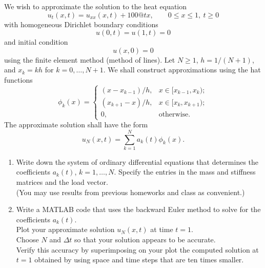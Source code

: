 We wish to approximate the solution to the heat equation 
\[
u_t(x,t) =  u_{xx}(x,t) + 100@t x, \qquad 0\le x \le 1,\ t\ge 0
\]
with homogeneous Dirichlet boundary conditions
\[
u(0,t) = u(1,t) = 0
\]
and initial condition
\[
u(x,0) = 0
\]
using the finite element method (method of lines).
Let $N\ge 1$,  $h = 1/(N+1)$,  and $x_k = kh$ for $k = 0, \ldots, N+1$.
We shall construct approximations using the hat functions
\[
\phi_k(x) = \left\{ \begin{array}{ll}
           (x-x_{k-1})/h, & x\in [x_{k-1}, x_k);\\
           (x_{k+1}-x)/h, & x\in [x_k, x_{k+1});\\
            0,             & \mbox{otherwise}.
          \end{array}\right. 
          \]
The approximate solution shall have the form
\[
 u_N(x,t) = \sum_{k=1}^N a_k(t) \phi_k(x).
 \]

\begin{enumerate}
\item Write down the system of ordinary differential equations that determines
      the coefficients $a_k(t)$, $k=1,\ldots, N$.  Specify the
      entries in the mass and stiffness matrices and the load vector.\\
      (You may use results from previous homeworks and class as convenient.)

\item Write a MATLAB code that uses the backward Euler method
      to solve for the coefficients $a_k(t)$.\\
      Plot your approximate solution $u_N(x,t)$ at time $t = 1$.\\
      Choose $N$ and $\Delta t$ so that your solution appears to be accurate.\\
      Verify this accuracy by superimposing on your plot the computed
      solution at $t=1$ obtained by using space and time steps that are ten times smaller.

\end{enumerate}


